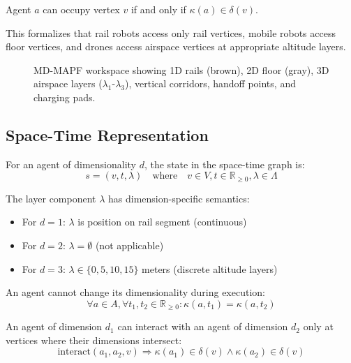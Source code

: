 \begin{definition}
Agent $a$ can occupy vertex $v$ if and only if $\kappa(a) \in \delta(v)$.
\end{definition}

This formalizes that rail robots access only rail vertices, mobile robots access floor vertices, and drones access airspace vertices at appropriate altitude layers.

\begin{figure}[htbp]
\centering

\caption{MD-MAPF workspace showing 1D rails (brown), 2D floor (gray), 3D airspace layers ($\lambda_1$-$\lambda_3$), vertical corridors, handoff points, and charging pads.}
\label{fig:workspace}
\end{figure}

\subsection{Space-Time Representation}

\begin{definition}
For an agent of dimensionality $d$, the state in the space-time graph is:
\begin{equation}
s = (v, t, \lambda) \quad \text{where} \quad v \in V, t \in \mathbb{R}_{\geq 0}, \lambda \in \Lambda
\end{equation}
\end{definition}

The layer component $\lambda$ has dimension-specific semantics:
\begin{itemize}
    \item For $d = 1$: $\lambda$ is position on rail segment (continuous)
    \item For $d = 2$: $\lambda = \emptyset$ (not applicable)
    \item For $d = 3$: $\lambda \in \{0, 5, 10, 15\}$ meters (discrete altitude layers)
\end{itemize}

\begin{axiom}
An agent cannot change its dimensionality during execution:
\begin{equation}
\forall a \in A, \forall t_1, t_2 \in \mathbb{R}_{\geq 0}: \kappa(a, t_1) = \kappa(a, t_2)
\end{equation}
\end{axiom}

\begin{axiom}
An agent of dimension $d_1$ can interact with an agent of dimension $d_2$ only at vertices where their dimensions intersect:
\begin{equation}
\text{interact}(a_1, a_2, v) \Rightarrow \kappa(a_1) \in \delta(v) \land \kappa(a_2) \in \delta(v)
\end{equation}
\end{axiom}

